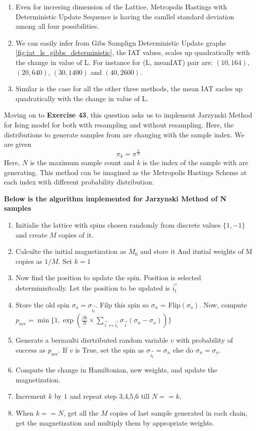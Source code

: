 \documentclass[11pt]{article}
\begin{document}
\begin{enumerate}
	\item Even for incresing dimension of the Lattice, Metropolis Hastings with Deterministic Update Sequence is having the samllel standard deviation among all four possibilities.
	\item We can easily infer from Gibs Samplign Deterministic Update graphs \ref{fig:iat_ls_gibbs_deterministic}, the IAT values, scales up quadratically with the change in value of L. For instance for (L, meanIAT) pair are: $(10,164)$, $(20,640)$, $(30,1400)$ and $(40, 2600)$.
	\item Similar is the case for all the other three methods, the mean IAT sacles up quadratically with the change in value of L.
\end{enumerate}
\par
\par
\noindent Moving on to \textbf{Exercise 43}, this question asks us to implement Jarzynski Method for Ising model for both with resampling and without resampling.
Here, the distributions to generate samples from are changing with the sample index.
We are given 
$$\pi_k = \pi^{\frac{k}{N}}$$
Here, $N$ is the maximum sample count and $k$ is the index of the sample with are generating. This method can be imagined as the Metropolis Hastings Scheme at each index with different probability distribution.

\noindent \textbf{Below is the algorithm implemented for Jarzynski Method of N samples}
\begin{enumerate}
    \item Initialie the lattice with spins chosen randomly from discrete values $\{1, -1\}$ and create $M$ copies of it.
    \item Calculte the initial magnetization as $M_{0}$ and store it And itntial weights of M copies as $1/M$. Set $k = 1$
    \item Now find the position to update the spin. Position is selected determinisitcally. Let the position to be updated is $\overrightarrow{i_{t}}$
    \item Store the old spin $\sigma_{o} = \sigma_{\overrightarrow{i_{t}}}$. Filp this spin so $\sigma_{n}$ = Flip$(\sigma_{o})$. 
	Now, compute $p_{acc} = \min\{1, \exp{\left(\frac{\beta k}{N} \times \sum_{{\overrightarrow{i}} \leftrightarrow \overrightarrow{i_{t}}} \sigma_{\overrightarrow{i}} (\sigma_n - \sigma_o) \right)}\}$
    \item Generate a bernaulti disrtributed random variable $v$ with probability of success as $p_{acc}$. If $v$ is True, set the spin as $\sigma_{\overrightarrow{i_{t}}} = \sigma_n$ else do $\sigma_n = \sigma_o$.
    \item Compute the change in Hamiltonian, new weights, and update the magnetization.
    \item Increment $k$ by $1$ and repeat step 3,4,5,6 till $N == k$.
    \item When $k == N$, get all the $M$ copies of last sample generated in each chain, get the magnetization and multiply them by appropriate weights.
\end{enumerate}
\end{document}
